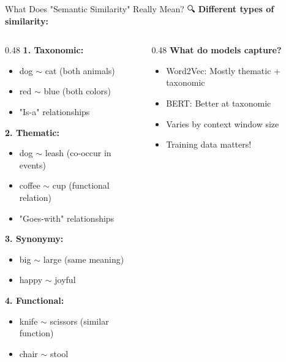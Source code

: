 \documentclass[aspectratio=169]{beamer}
\begin{document}
\begin{frame}[shrink=10]{What Does "Semantic Similarity" Really Mean? 🔍}
\textbf{Different types of similarity:}

\vspace{1em}

\begin{columns}[T]
\begin{column}{0.48\textwidth}
\textbf{1. Taxonomic:}
\begin{itemize}\setlength{\itemsep}{0pt}
    \item dog $\sim$ cat (both animals)
    \item red $\sim$ blue (both colors)
    \item "Is-a" relationships
\end{itemize}

\vspace{0.3em}
\textbf{2. Thematic:}
\begin{itemize}\setlength{\itemsep}{0pt}
    \item dog $\sim$ leash (co-occur in events)
    \item coffee $\sim$ cup (functional relation)
    \item "Goes-with" relationships
\end{itemize}

\vspace{0.3em}
\textbf{3. Synonymy:}
\begin{itemize}\setlength{\itemsep}{0pt}
    \item big $\sim$ large (same meaning)
    \item happy $\sim$ joyful
\end{itemize}

\vspace{0.3em}
\textbf{4. Functional:}
\begin{itemize}\setlength{\itemsep}{0pt}
    \item knife $\sim$ scissors (similar function)
    \item chair $\sim$ stool
\end{itemize}
\end{column}

\begin{column}{0.48\textwidth}
\textbf{What do models capture?}

\vspace{0.5em}
\begin{itemize}\setlength{\itemsep}{0pt}
    \item Word2Vec: Mostly thematic + taxonomic
    \item BERT: Better at taxonomic
    \item Varies by context window size
    \item Training data matters!
\end{itemize}


\end{column}
\end{columns}
\end{frame}
\end{document}

